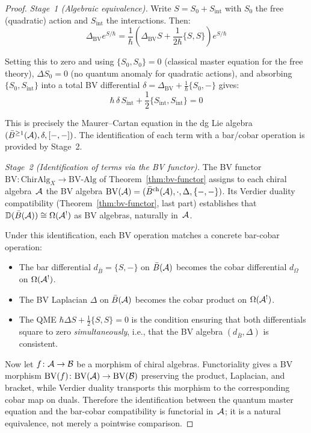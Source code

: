 \begin{proof}
\emph{Stage~1 (Algebraic equivalence).}
Write $S = S_0 + S_{\text{int}}$ with $S_0$ the free (quadratic) action and $S_{\text{int}}$ the interactions.  Then:
\[\Delta_{\text{BV}} e^{S/\hbar} = \frac{1}{\hbar}\left(\Delta_{\text{BV}} S +
\frac{1}{2\hbar}\{S, S\}\right) e^{S/\hbar}\]

Setting this to zero and using $\{S_0, S_0\} = 0$ (classical master equation for the free theory), $\Delta S_0 = 0$ (no quantum anomaly for quadratic actions), and absorbing $\{S_0, S_{\text{int}}\}$ into a total BV differential $\delta = \Delta_{\text{BV}} + \frac{1}{\hbar}\{S_0, -\}$ gives:
\[\hbar\,\delta\, S_{\text{int}} + \frac{1}{2}\{S_{\text{int}}, S_{\text{int}}\} = 0\]

This is precisely the Maurer--Cartan equation in the dg Lie algebra
$(\bar{B}^{\ge 1}(\mathcal{A}), \delta, [-,-])$.  The identification of each
term with a bar/cobar operation is provided by Stage~2.

\emph{Stage~2 (Identification of terms via the BV functor).}
The BV functor $\mathrm{BV}: \mathrm{ChirAlg}_X \to \mathrm{BV\text{-}Alg}$
of Theorem~\ref{thm:bv-functor} assigns to each chiral algebra~$\mathcal{A}$ the BV algebra
$\mathrm{BV}(\mathcal{A}) = (\bar{B}^{\mathrm{ch}}(\mathcal{A}), \cdot, \Delta, \{-,-\})$.
Its Verdier duality compatibility (Theorem~\ref{thm:bv-functor}, last part)
establishes that $\mathbb{D}(\bar{B}(\mathcal{A})) \cong \Omega(\mathcal{A}^!)$ as BV algebras,
naturally in~$\mathcal{A}$.

Under this identification, each BV operation matches a concrete
bar-cobar operation:
\begin{itemize}
\item The bar differential $d_{\bar{B}} = \{S, -\}$ on $\bar{B}(\mathcal{A})$ becomes
the cobar differential $d_\Omega$ on $\Omega(\mathcal{A}^!)$.
\item The BV Laplacian $\Delta$ on $\bar{B}(\mathcal{A})$ becomes the cobar product on $\Omega(\mathcal{A}^!)$.
\item The QME $\hbar\Delta S + \tfrac{1}{2}\{S,S\} = 0$ is the condition ensuring
that both differentials square to zero \emph{simultaneously}, i.e.,
that the BV algebra $(d_{\bar{B}}, \Delta)$ is consistent.
\end{itemize}

Now let $f\colon \mathcal{A} \to \mathcal{B}$ be a morphism of chiral algebras.
Functoriality gives a BV morphism
$\mathrm{BV}(f)\colon \mathrm{BV}(\mathcal{A}) \to \mathrm{BV}(\mathcal{B})$
preserving the product, Laplacian, and bracket, while Verdier
duality transports this morphism to the corresponding cobar map on
duals.  Therefore the identification between the quantum master
equation and the bar-cobar compatibility is functorial in~$\mathcal{A}$; it is
a natural equivalence, not merely a pointwise comparison.
\end{proof}

